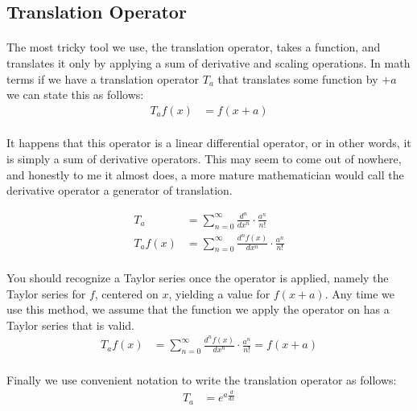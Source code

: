 \documentclass{article}
\begin{document}
	\subsection{Translation Operator}
	\paragraph{}
	The most tricky tool we use, the translation operator, takes a function, and translates it only by applying a sum of derivative and scaling operations. In math terms if we have a translation operator $T_{a}$ that translates some function by $+a$ we can state this as follows:
	\begin{align}
		T_{a}f(x) &= f(x + a)
	\end{align}
	\paragraph{}
		It happens that this operator is a linear differential operator, or in other words, it is simply a sum of derivative operators. This may seem to come out of nowhere, and honestly to me it almost does, a more mature mathematician would call the derivative operator a generator of translation.
	
	\begin{align}
		T_{a} &= \sum_{n = 0}^{\infty}\frac{d^{n}}{dx^{n}} \cdot \frac{a^{n}}{n!}\\
		T_{a}f(x) &= \sum_{n = 0}^{\infty}\frac{d^{n}f(x)}{dx^{n}} \cdot \frac{a^{n}}{n!}
	\end{align}
	\paragraph{}
	You should recognize a Taylor series once the operator is applied, namely the Taylor series for $f$, centered on $x$, yielding a value for $f(x + a)$. Any time we use this method, we assume that the function we apply the operator on has a Taylor series that is valid.
	\begin{align}
		T_{a}f(x) &= \sum_{n = 0}^{\infty}\frac{d^{n}f(x)}{dx^{n}} \cdot \frac{a^{n}}{n!} = f(x + a)
	\end{align}
	\paragraph{}
	Finally we use convenient notation to write the translation operator as follows:
	\begin{align}\label{eq:test}
		T_{a} &= e^{a\frac{d}{dx}}
	\end{align}
\end{document}

